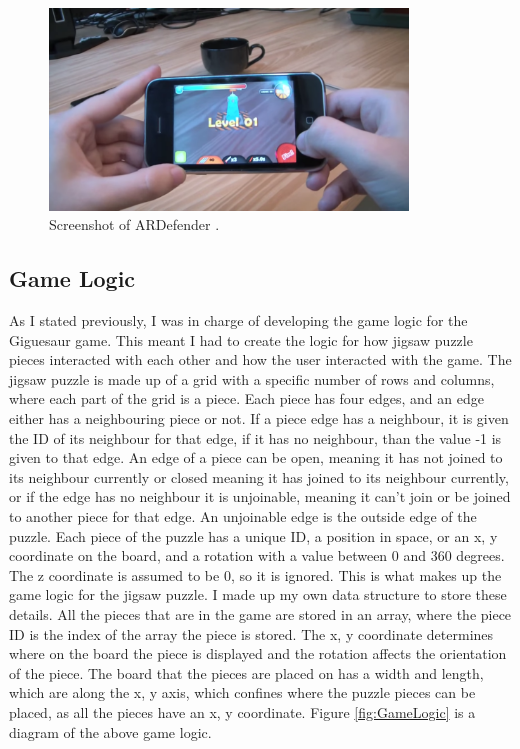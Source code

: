 \documentclass{article}
\begin{document}
\begin{figure}[ht]
\begin{center}
\includegraphics[width=0.85\textwidth]{images/ARDefenderImage}
\caption{Screenshot of ARDefender \cite{img:ARDefender}.}
\label{fig:ARDefender}
\end{center}
\end{figure}

\subsection{Game Logic}
As I stated previously, I was in charge of developing the game logic for the
Giguesaur game. This meant I had to create the logic for how jigsaw puzzle
pieces interacted with each other and how the user interacted with the game. The
jigsaw puzzle is made up of a grid with a specific number of rows and columns,
where each part of the grid is a piece. Each piece has four edges, and an edge
either has a neighbouring piece or not. If a piece edge has a neighbour, it is
given the ID of its neighbour for that edge, if it has no neighbour, than the
value -1 is given to that edge. An edge of a piece can be open, meaning it has
not joined to its neighbour currently or closed meaning it has joined to its
neighbour currently, or if the edge has no neighbour it is unjoinable, meaning
it can't join or be joined to another piece for that edge. An unjoinable edge is
the outside edge of the puzzle. Each piece of the puzzle has a unique ID, a
position in space, or an x, y coordinate on the board, and a rotation with a
value between 0 and 360 degrees. The z coordinate is assumed to be 0, so it is
ignored. This is what makes up the game logic for the jigsaw puzzle. I made up
my own data structure to store these details. All the pieces that are in the
game are stored in an array, where the piece ID is the index of the array the
piece is stored. The x, y coordinate determines where on the board the piece is
displayed and the rotation affects the orientation of the piece. The board that
the pieces are placed on has a width and length, which are along the x, y axis,
which confines where the puzzle pieces can be placed, as all the pieces have an
x, y coordinate. Figure \ref{fig:GameLogic} is a diagram of the above game
logic.
\end{document}
